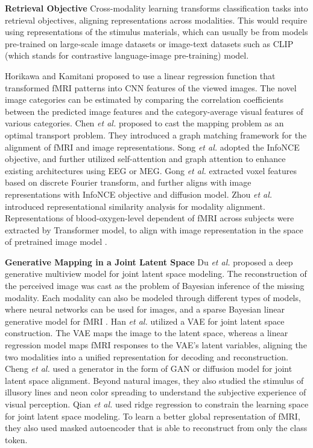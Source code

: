 \documentclass[journal]{IEEEtran}
\begin{document}
\textbf{Retrieval Objective} Cross-modality learning transforms classification tasks into retrieval objectives, aligning representations across modalities. This would require using representations of the stimulus materials, which can usually be from models pre-trained on large-scale image datasets or image-text datasets such as CLIP (which stands for contrastive language-image pre-training) \cite{Radford2021} model.

Horikawa and Kamitani \cite{Horikawa2017} proposed to use a linear regression function that transformed fMRI patterns into CNN features of the viewed images. The novel image categories can be estimated by comparing the correlation coefficients between the predicted image features and the category-average visual features of various categories. Chen \emph{et al.} \cite{Chen2024a} proposed to cast the mapping problem as an optimal transport problem. They introduced a graph matching framework for the alignment of fMRI and image representations. Song \emph{et al.} \cite{Song2024} adopted the InfoNCE objective, and further utilized self-attention and graph attention to enhance existing architectures using EEG or MEG. Gong \emph{et al.} \cite{Gong2024} extracted voxel features based on discrete Fourier transform, and further aligns with image representations with InfoNCE objective and diffusion model. Zhou \emph{et al.} \cite{Zhou2024} introduced representational similarity analysis for modality alignment. Representations of blood-oxygen-level dependent of fMRI across subjects were extracted by Transformer model, to align with image representation in the space of pretrained image model \cite{Radford2021}.

\textbf{Generative Mapping in a Joint Latent Space} Du \emph{et al.} \cite{Du2017} proposed a deep generative multiview model for joint latent space modeling. The reconstruction of the perceived image was cast as the problem of Bayesian inference of the missing modality. Each modality can also be modeled through different types of models, where neural networks can be used for images, and a sparse Bayesian linear generative model for fMRI \cite{Du2019}. Han \emph{et al.} \cite{Han2019} utilized a VAE for joint latent space construction. The VAE maps the image to the latent space, whereas a linear regression model maps fMRI responses to the VAE’s latent variables, aligning the two modalities into a unified representation for decoding and reconstruction. Cheng \emph{et al.} \cite{Cheng2023} used a generator in the form of GAN or diffusion model for joint latent space alignment. Beyond natural images, they also studied the stimulus of illusory lines and neon color spreading to understand the subjective experience of visual perception. Qian \emph{et al.} \cite{Qian2024} used ridge regression to constrain the learning space for joint latent space modeling. To learn a better global representation of fMRI, they also used masked autoencoder \cite{He2022} that is able to reconstruct from only the class token.
\end{document}

